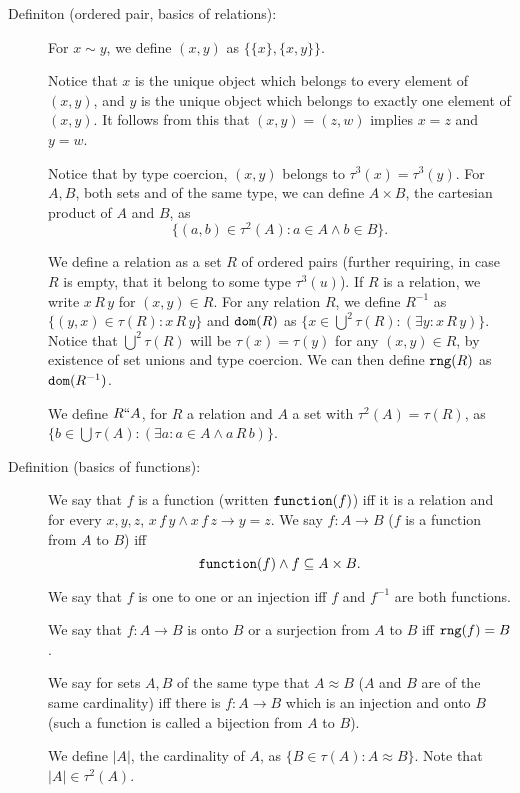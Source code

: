 \documentclass[12pt]{article}
\begin{document}
\begin{description}
\item[Definiton (ordered pair, basics of relations):]  For $x \sim y$, we define $(x,y)$ as $\{\{x\},\{x,y\}\}$.  

Notice that $x$ is the unique object which belongs to every element of $(x,y)$, and $y$ is the unique object which belongs to exactly one element of $(x,y)$.  It follows from this that $(x,y)=(z,w)$ implies $x=z$ and $y=w$.  

Notice that by type coercion, $(x,y)$ belongs
to $\tau^3(x) = \tau^3(y)$.  For $A , B$, both sets and of the same type, we can define $A \times B$, the cartesian product of $A$ and $B$,  as $$\{(a,b)\in \tau^2(A):a \in A \wedge b \in B\}.$$

We define a relation as a set $R$ of ordered pairs (further requiring, in case $R$ is empty, that it belong to some type $\tau^3(u)$).  If $R$ is a relation, we write $x \, R\, y$ for $(x,y) \in R$.  For any relation $R$, we define $R^{-1}$ as \newline $\{(y,x) \in \tau(R):x \, R\, y\}$ and ${\tt dom}(R)$ as $\{x \in \bigcup^2 \tau(R):(\exists y:x \, R\, y)\}$.  Notice that
$\bigcup^2 \tau(R)$ will be $\tau(x) = \tau(y)$ for any $(x,y)\in R$, by existence of set unions and type coercion. We can then define ${\tt rng}(R)$ as ${\tt dom}(R^{-1})$.

We define $R``A$, for $R$ a relation and $A$ a set with $\tau^2(A) = \tau(R)$, as $\{b \in \bigcup \tau(A):(\exists a:a \in A \wedge a \, R \, b)\}$.

\item[Definition (basics of functions):]  We say that $f$ is a function (written ${\tt function}(f)$) iff it is a relation and for every $x,y,z$, $x \,f\,y \wedge x \,f\,z \rightarrow y=z$.  We say $f:A \rightarrow B$ ($f$ is a function from $A$ to $B$) iff $${\tt function}(f) \wedge f \subseteq A \times B.$$  

We say that $f$ is one to one or an injection iff $f$ and $f^{-1}$ are both functions.

We say that $f:A \rightarrow B$ is onto $B$ or a surjection from $A$ to $B$ iff ${\tt rng}(f)=B$.  

We say for sets $A,B$ of the same type that $A \approx B$ ($A$ and $B$ are of the same cardinality) iff there is $f:A \rightarrow B$ which is an injection and onto $B$ (such a function is called a bijection from $A$ to $B$).  

We define $|A|$, the cardinality of $A$,
as $\{B \in \tau(A):A \approx B\}$.  Note that $|A| \in \tau^2(A)$.


\end{description}
\end{document}
